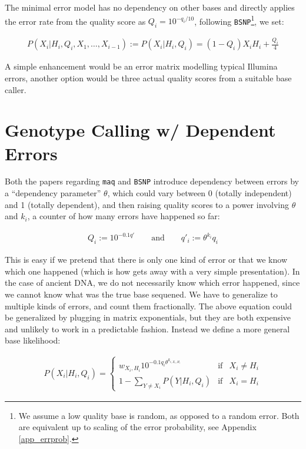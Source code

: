 \documentclass{article}
\begin{document}
The minimal error model has no dependency on other bases and directly applies the error rate from the quality score as $Q_i =
10^{-q_i/10}$, following \texttt{BSNP}\footnote{We assume a low quality base is random, as opposed to a random error.  Both
are equivalent up to scaling of the error probability, see Appendix \ref{app_errprob}.}, we set:

\begin{align*}
P(X_i|H_i,Q_i,X_1,\ldots,X_{i-1}) := P(X_i|H_i,Q_i) = (1-Q_i) X_i H_i + \frac{Q_i}{4}
\end{align*}

A simple enhancement would be an error matrix modelling typical Illumina errors, another option would be three actual quality
scores from a suitable base caller.

\section{Genotype Calling w/ Dependent Errors}

Both the papers regarding \texttt{maq} and \texttt{BSNP} introduce dependency between errors by a ``dependency parameter'' $\theta$,
which could vary between 0 (totally independent) and 1 (totally dependent), and then raising quality scores to a power involving
$\theta$ and $k_i$, a counter of how many errors have happened so far:

\begin{align*}
Q_i := 10^{-0.1 q'} \qquad \mbox{and} \qquad q'_i := \theta^{k_i} q_i
\end{align*}

This is easy if we pretend that there is only one kind of error or that
we know which one happened (which is how \cite{samtools} gets away with
a very simple presentation).  In the case of ancient DNA, we
do not necessarily know which error happened, since we cannot know what was the true base sequened.  We have to generalize to
multiple kinds of errors, and count them fractionally.  The above equation could be generalized by plugging in matrix exponentials,
but they are both expensive and unlikely to work in a predictable fashion.  Instead we define a more general base likelihood:

\begin{align*}
P(X_i|H_i,Q_i) = \left\{ \begin{array}{ccc}
 w_{X_i,H_i} 10^{-0.1 q_i \theta^{k_{i,X_i,H_i}}} & \mbox{if} & X_i \neq H_i \\
 1 - \sum_{Y \neq X_i} P(Y|H_i,Q_i) & \mbox{if} & X_i = H_i 
\end{array} \right.
\end{align*}
\end{document}
